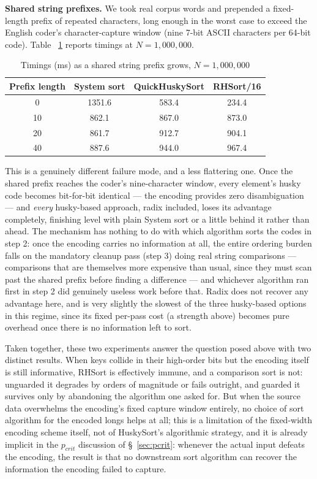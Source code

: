 \documentclass[twoside,leqno,twocolumn]{article}
\begin{document}
\textbf{Shared string prefixes.}
We took real corpus words and prepended a fixed-length prefix of repeated characters,
long enough in the worst case to exceed the English coder's character-capture window (nine 7-bit ASCII characters per 64-bit code).
Table ~\ref{tab:AdversarialPrefix} reports timings at $N = 1{,}000{,}000$.

\begin{table}
  \caption{Timings (ms) as a shared string prefix grows, $N = 1{,}000{,}000$}
  \label{tab:AdversarialPrefix}
  \centering
  \begin{tabular}{cccc}
    \toprule
    Prefix length & System sort & QuickHuskySort & RHSort/16 \\
    \midrule
    0  & 1351.6 & 583.4 & 234.4 \\
    10 & 862.1 & 867.0 & 873.0 \\
    20 & 861.7 & 912.7 & 904.1 \\
    40 & 887.6 & 944.0 & 967.4 \\
    \bottomrule
  \end{tabular}
\end{table}

This is a genuinely different failure mode, and a less flattering one.
Once the shared prefix reaches the coder's nine-character window, every element's husky code becomes bit-for-bit identical —
the encoding provides zero disambiguation — and \emph{every} husky-based approach,
radix included, loses its advantage completely,
finishing level with plain System sort or a little behind it rather than ahead.
The mechanism has nothing to do with which algorithm sorts the codes in step 2:
once the encoding carries no information at all,
the entire ordering burden falls on the mandatory cleanup pass (step 3) doing real string comparisons —
comparisons that are themselves more expensive than usual,
since they must scan past the shared prefix before finding a difference —
and whichever algorithm ran first in step 2 did genuinely useless work before that.
Radix does not recover any advantage here, and is very slightly the slowest of the three husky-based options in this regime,
since its fixed per-pass cost (a strength above) becomes pure overhead once there is no information left to sort.

Taken together, these two experiments answer the question posed above with two distinct results.
When keys collide in their high-order bits but the encoding itself is still informative,
RHSort is effectively immune, and a comparison sort is not:
unguarded it degrades by orders of magnitude or fails outright,
and guarded it survives only by abandoning the algorithm one asked for.
But when the source data overwhelms the encoding's fixed capture window entirely, no choice of sort algorithm for the encoded longs helps at all;
this is a limitation of the fixed-width encoding scheme itself, not of HuskySort's algorithmic strategy,
and it is already implicit in the $p_{crit}$ discussion of \S~\ref{sec:pcrit}:
whenever the actual input defeats the encoding,
the result is that no downstream sort algorithm can recover the information the encoding failed to capture.
\end{document}
